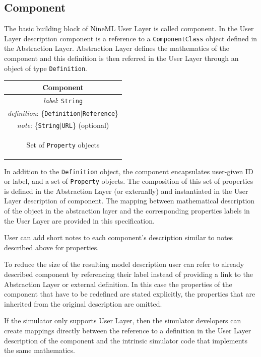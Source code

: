 \documentclass{article}
\begin{document}
\subsection{Component}

The basic building block of NineML User Layer is called component. In the
User Layer description component is a reference to a {\tt ComponentClass}
object defined in the Abstraction Layer. Abstraction Layer defines the
mathematics of the component and this definition is then referred in the
User Layer through an object of type {\tt Definition}.

\begin{table}[htb]
\center
\begin{tabular}{|c|}
\hline
\hline
Component \\
\hline
\hline
{\em label}: {\tt String} \\
\hline
{\em definition}: \{{\tt Definition}$|${\tt Reference}\}\\
\hline
{\em note}: \{{\tt String}$|${\tt URL}\} (optional)\\
\hline
\colorbox{issuecolor}{\parbox{0.4\linewidth}
{\center Set of {\tt Property} objects}} \\
\hline
\end{tabular}
\end{table}

In addition to the {\tt Definition} object, the component encapsulates
user-given ID or label, and a set of {\tt Property} objects. The composition
of this set of properties is defined in the Abstraction Layer (or externally)
and instantiated in the User Layer description of component. The mapping
between mathematical description of the object in the abstraction
layer and the corresponding properties labels in the User Layer are
provided in this specification.

User can add short notes to each component's description similar to
notes described above for properties.

To reduce the size of the resulting model description user can refer to
already described component by referencing their label instead of providing
a link to the Abstraction Layer or external definition. In this case the
properties of the component that have to be redefined are stated explicitly,
the properties that are inherited from the original description are omitted.

If the simulator only supports User Layer, then the simulator developers
can create mappings directly between the reference to a definition in the
User Layer description of the component and the intrinsic simulator code
that implements the same mathematics.
\end{document}
